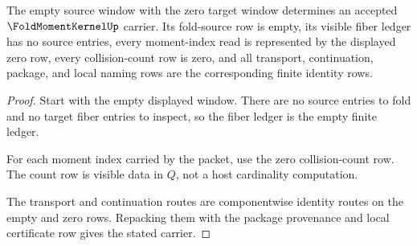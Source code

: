 \begin{theorem}
\label{thm:fold-moment-kernel-zero-window-packet}
The empty source window with the zero target window determines an accepted
$\FoldMomentKernelUp$ carrier. Its fold-source row is empty, its visible fiber
ledger has no source entries, every moment-index read is represented by the
displayed zero row, every collision-count row is zero, and all transport,
continuation, package, and local naming rows are the corresponding finite
identity rows.
\end{theorem}
\begin{proof}
Start with the empty displayed window. There are no source entries to fold and
no target fiber entries to inspect, so the fiber ledger is the empty finite
ledger.

For each moment index carried by the packet, use the zero collision-count row.
The count row is visible data in $Q$, not a host cardinality computation.

The transport and continuation routes are componentwise identity routes on the
empty and zero rows. Repacking them with the package provenance and local
certificate row gives the stated carrier.
\end{proof}

